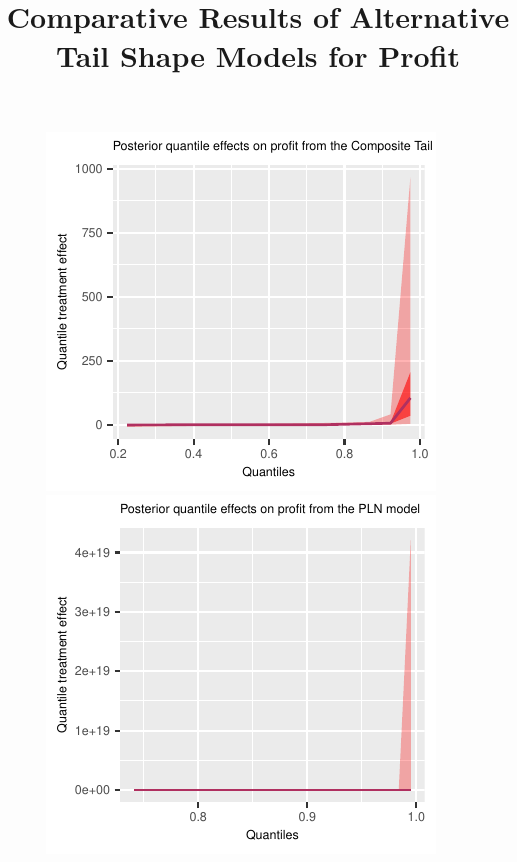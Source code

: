 \documentclass[english,12pt]{article}\usepackage{lmodern}
\numberwithin{equation}{section}
\begin{document}
\clearpage





 
  \begin{figure}[h!]
  \centering
  \title{Comparative Results of Alternative Tail Shape Models for Profit}
    \includegraphics[scale=0.4]{posterior_parent_quantile_TEs_profit_composite.pdf}\\
    \includegraphics[scale=0.4]{posterior_parent_quantile_TEs_profit_PLN.pdf}\\

\end{figure}
\end{document}
